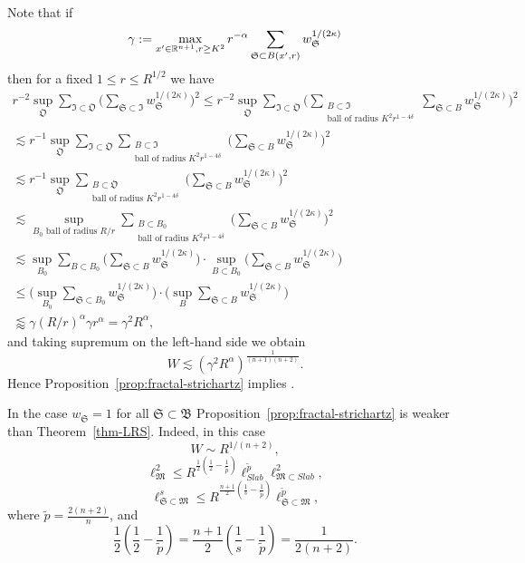 \documentclass[biblatex]{pzorin-note}
\newcommand{\bB}{\mathfrak{B}} %
\newcommand{\bM}{\mathfrak{M}} %
\newcommand{\bS}{\mathfrak{S}} %
\newcommand{\bO}{\mathfrak{O}} %
\newcommand{\bI}{\mathfrak{I}} %
\begin{document}
\begin{remark}
Note that if
\begin{equation}\label{ga}
\gamma:=
\max_{x'\in \R^{n+1},r\geq K^2} r^{-\alpha} \sum_{\bS \subset B(x',r)} w_{\bS}^{1/(2\kappa)}
\end{equation}
then for a fixed $1 \leq r \leq R^{1/2}$ we have
\begin{multline*}
r^{-2} \sup_{\bO} \sum_{\bI \subset \bO} \bigl( \sum_{\bS \subset \bI} w_{\bS}^{1/(2\kappa)} \bigr)^{2}
\leq
r^{-2} \sup_{\bO} \sum_{\bI \subset \bO} \bigl( \sum_{\substack{B \subset \bI\\ \text{ball of radius } K^{2}r^{1-4\delta}}} \sum_{\bS \subset B} w_{\bS}^{1/(2\kappa)} \bigr)^{2}\\
\lesssim
r^{-1} \sup_{\bO} \sum_{\bI \subset \bO} \sum_{\substack{B \subset \bI\\ \text{ball of radius } K^{2}r^{1-4\delta}}} \bigl( \sum_{\bS \subset B} w_{\bS}^{1/(2\kappa)} \bigr)^{2}\\
\lesssim
r^{-1} \sup_{\bO} \sum_{\substack{B \subset \bO\\ \text{ball of radius } K^{2}r^{1-4\delta}}} \bigl( \sum_{\bS \subset B} w_{\bS}^{1/(2\kappa)} \bigr)^{2}\\
\lesssim
\sup_{B_{0} \text{ ball of radius } R/r} \sum_{\substack{B \subset B_{0}\\ \text{ball of radius } K^{2}r^{1-4\delta}}} \bigl( \sum_{\bS \subset B} w_{\bS}^{1/(2\kappa)} \bigr)^{2}\\
\lesssim
\sup_{B_{0}} \sum_{B \subset B_{0}} \bigl( \sum_{\bS \subset B} w_{\bS}^{1/(2\kappa)} \bigr)
\cdot \sup_{B \subset B_{0}} \bigl( \sum_{\bS \subset B} w_{\bS}^{1/(2\kappa)} \bigr)\\
\leq
\bigl( \sup_{B_{0}} \sum_{\bS \subset B_{0}} w_{\bS}^{1/(2\kappa)} \bigr)
\cdot \bigl( \sup_{B} \sum_{\bS \subset B} w_{\bS}^{1/(2\kappa)} \bigr)\\
\lessapprox
\gamma (R/r)^{\alpha} \gamma r^{\alpha}
=
\gamma^{2} R^{\alpha},
\end{multline*}
and taking supremum on the left-hand side we obtain
\[
W \lesssim (\gamma^{2} R^{\alpha})^{\frac{1}{(n+1)(n+2)}}.
\]
Hence Proposition~\ref{prop:fractal-strichartz} implies \cite[Proposition 3.1]{arxiv:1805.02775}.
\end{remark}

\begin{remark}
In the case $w_{\bS} = 1$ for all $\bS \subset \bB$ Proposition~\ref{prop:fractal-strichartz} is weaker than Theorem~\ref{thm-LRS}.
Indeed, in this case
\[
W \sim R^{1/(n+2)},
\]
\[
\ell^{2}_{\bM}
\leq R^{\frac{1}{2} (\frac{1}{2}-\frac{1}{\tilde{p}})} \ell^{\tilde{p}}_{Slab} \ell^{2}_{\bM \subset Slab},
\]
\[
\ell^{s}_{\bS \subset \bM} \leq
R^{\frac{n+1}{2} (\frac{1}{s}-\frac{1}{\tilde{p}})} \ell^{\tilde{p}}_{\bS \subset \bM},
\]
where $\tilde{p} = \frac{2(n+2)}{n}$, and
\[
\frac{1}{2} (\frac{1}{2}-\frac{1}{\tilde{p}})
=
\frac{n+1}{2} (\frac{1}{s}-\frac{1}{\tilde{p}})
=
\frac{1}{2(n+2)}.
\]
\end{remark}
\end{document}
